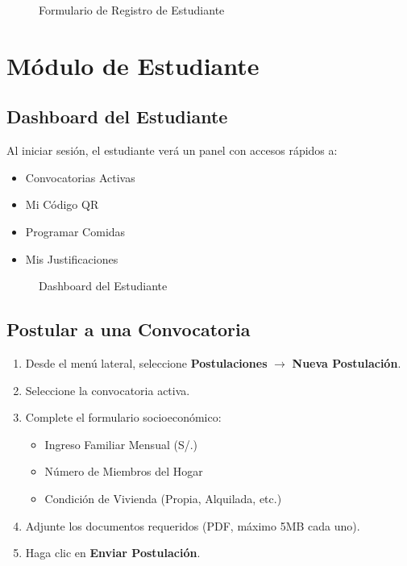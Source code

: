 \documentclass[12pt,a4paper]{article}
\begin{document}
\begin{figure}[h]
    \centering
    \caption{Formulario de Registro de Estudiante}
    \label{fig:registro}
\end{figure}

\section{Módulo de Estudiante}

\subsection{Dashboard del Estudiante}
Al iniciar sesión, el estudiante verá un panel con accesos rápidos a:
\begin{itemize}
    \item Convocatorias Activas
    \item Mi Código QR
    \item Programar Comidas
    \item Mis Justificaciones
\end{itemize}

\begin{figure}[h]
    \centering
    \caption{Dashboard del Estudiante}
    \label{fig:dashboard_estudiante}
\end{figure}

\subsection{Postular a una Convocatoria}
\begin{enumerate}
    \item Desde el menú lateral, seleccione \textbf{Postulaciones} $\rightarrow$ \textbf{Nueva Postulación}.
    \item Seleccione la convocatoria activa.
    \item Complete el formulario socioeconómico:
    \begin{itemize}
        \item Ingreso Familiar Mensual (S/.)
        \item Número de Miembros del Hogar
        \item Condición de Vivienda (Propia, Alquilada, etc.)
    \end{itemize}
    \item Adjunte los documentos requeridos (PDF, máximo 5MB cada uno).
    \item Haga clic en \textbf{Enviar Postulación}.
\end{enumerate}
\end{document}
